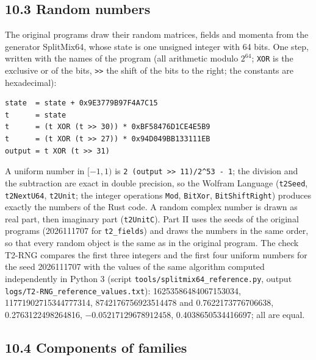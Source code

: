 \documentclass[
  10pt,
]{article}
\begin{document}
\hypertarget{random-numbers}{%
\subsection{10.3 Random numbers}\label{random-numbers}}

The original programs draw their random matrices, fields and momenta
from the generator SplitMix64, whose state is one unsigned integer with
64 bits. One step, written with the names of the program (all arithmetic
modulo \(2^{64}\); \texttt{XOR} is the exclusive or of the bits,
\texttt{\textgreater{}\textgreater{}} the shift of the bits to the
right; the constants are hexadecimal):

\begin{verbatim}
state  = state + 0x9E3779B97F4A7C15
t      = state
t      = (t XOR (t >> 30)) * 0xBF58476D1CE4E5B9
t      = (t XOR (t >> 27)) * 0x94D049BB133111EB
output = t XOR (t >> 31)
\end{verbatim}

A uniform number in \([-1,1)\) is
\texttt{2\ (output\ \textgreater{}\textgreater{}\ 11)/2\^{}53\ -\ 1};
the division and the subtraction are exact in double precision, so the
Wolfram Language (\texttt{t2Seed}, \texttt{t2NextU64}, \texttt{t2Unit};
the integer operations \texttt{Mod}, \texttt{BitXor},
\texttt{BitShiftRight}) produces exactly the numbers of the Rust code. A
random complex number is drawn as real part, then imaginary part
(\texttt{t2UnitC}). Part II uses the seeds of the original programs
(2026111707 for \texttt{t2\_fields}) and draws the numbers in the same
order, so that every random object is the same as in the original
program. The check T2-RNG compares the first three integers and the
first four uniform numbers for the seed 2026111707 with the values of
the same algorithm computed independently in Python 3 (script
\texttt{tools/splitmix64\_reference.py}, output
\texttt{logs/T2-RNG\_reference\_values.txt}): 16253586484067153034,
11771902715344777314, 8742176756923514478 and 0.7622173776706638,
0.2763122498264816, \(-0.05217129678912458\), 0.4038650534416697; all
are equal.

\hypertarget{components-of-families}{%
\subsection{10.4 Components of families}\label{components-of-families}}
\end{document}
